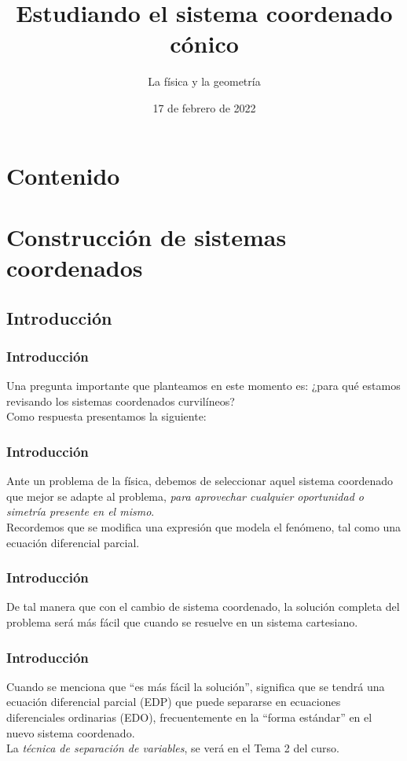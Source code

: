 \documentclass[12pt]{beamer}
\date{17 de febrero de 2022}
\title{Estudiando el sistema coordenado cónico}
\subtitle{La física y la geometría}
\begin{document}
\maketitle
\fontsize{14}{14}\selectfont
{}

\section*{Contenido}

\section{Construcción de sistemas coordenados}
\subsection{Introducción}

\begin{frame}
\frametitle{Introducción}
Una pregunta importante que planteamos en este momento es: ¿para qué estamos revisando los sistemas coordenados curvilíneos?
\\
\bigskip
\pause
Como respuesta presentamos la siguiente:
\end{frame}
\begin{frame}
\frametitle{Introducción}
Ante un problema de la física, debemos de seleccionar aquel sistema coordenado que mejor se adapte al problema, \emph{para aprovechar cualquier oportunidad o simetría presente en el mismo}.
\\
\bigskip
\pause
Recordemos que se modifica una expresión que modela el fenómeno, tal como una ecuación diferencial parcial.
\end{frame}
\begin{frame}
\frametitle{Introducción}
De tal manera que con el cambio de sistema coordenado, la solución completa del problema será más fácil que cuando se resuelve en un sistema cartesiano.
\end{frame}
\begin{frame}
\frametitle{Introducción}
Cuando se menciona que \enquote{es más fácil la solución}, significa que se tendrá una ecuación diferencial parcial (EDP) que puede separarse en ecuaciones diferenciales ordinarias (EDO), frecuentemente en la \enquote{forma estándar} en el nuevo sistema coordenado.
\\
\bigskip
\pause
La \emph{técnica de separación de variables}, se verá en el Tema 2 del curso.
\end{frame}
\end{document}
